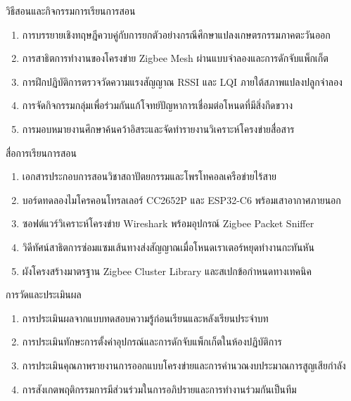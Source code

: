 \newpage

\begin{planbox}{วิธีสอนและกิจกรรมการเรียนการสอน}
\begin{enumerate}[topsep=1pt, itemsep=0.5pt, partopsep=0pt, parsep=0pt, leftmargin=1.5em]
    \item การบรรยายเชิงทฤษฎีควบคู่กับการยกตัวอย่างกรณีศึกษาแปลงเกษตรกรรมภาคตะวันออก
    \item การสาธิตการทำงานของโครงข่าย Zigbee Mesh ผ่านแบบจำลองและการดักจับแพ็กเก็ต
    \item การฝึกปฏิบัติการตรวจวัดความแรงสัญญาณ RSSI และ LQI ภายใต้สภาพแปลงปลูกจำลอง
    \item การจัดกิจกรรมกลุ่มเพื่อร่วมกันแก้โจทย์ปัญหาการเชื่อมต่อโหนดที่มีสิ่งกีดขวาง
    \item การมอบหมายงานศึกษาค้นคว้าอิสระและจัดทำรายงานวิเคราะห์โครงข่ายสื่อสาร
\end{enumerate}
\end{planbox}

\begin{planbox}{สื่อการเรียนการสอน}
\begin{enumerate}[topsep=1pt, itemsep=0.5pt, partopsep=0pt, parsep=0pt, leftmargin=1.5em]
    \item เอกสารประกอบการสอนวิชาสถาปัตยกรรมและโพรโทคอลเครือข่ายไร้สาย
    \item บอร์ดทดลองไมโครคอนโทรลเลอร์ CC2652P และ ESP32-C6 พร้อมเสาอากาศภายนอก
    \item ซอฟต์แวร์วิเคราะห์โครงข่าย Wireshark พร้อมอุปกรณ์ Zigbee Packet Sniffer
    \item วิดีทัศน์สาธิตการซ่อมแซมเส้นทางส่งสัญญาณเมื่อโหนดเราเตอร์หยุดทำงานกะทันหัน
    \item ผังโครงสร้างมาตรฐาน Zigbee Cluster Library และสเปกข้อกำหนดทางเทคนิค
\end{enumerate}
\end{planbox}

\begin{planbox}{การวัดและประเมินผล}
\begin{enumerate}[topsep=1pt, itemsep=0.5pt, partopsep=0pt, parsep=0pt, leftmargin=1.5em]
    \item การประเมินผลจากแบบทดสอบความรู้ก่อนเรียนและหลังเรียนประจำบท
    \item การประเมินทักษะการตั้งค่าอุปกรณ์และการดักจับแพ็กเก็ตในห้องปฏิบัติการ
    \item การประเมินคุณภาพรายงานการออกแบบโครงข่ายและการคำนวณงบประมาณการสูญเสียกำลัง
    \item การสังเกตพฤติกรรมการมีส่วนร่วมในการอภิปรายและการทำงานร่วมกันเป็นทีม
\end{enumerate}
\end{planbox}

